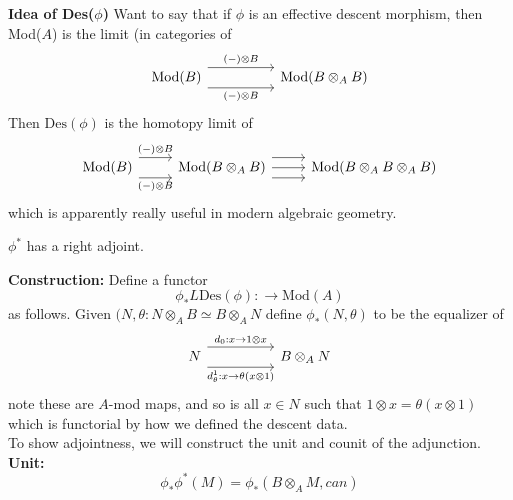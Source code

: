 \documentclass{article}
\theoremstyle{definition}
\theoremstyle{definition}
\theoremstyle{remark}
\begin{document}
\textbf{Idea of Des($\phi$)} Want to say that if $\phi$ is an effective descent morphism, then Mod($A$) is the limit (in categories of 
\[\begin{tikzcd}
	{\text{Mod}(B)} && {\text{Mod}(B\otimes_A B)}
	\arrow["{(-)\otimes B}"', shift right=3, from=1-1, to=1-3]
	\arrow["{(-)\otimes B}", shift left=3, from=1-1, to=1-3]
\end{tikzcd}\]
Then $\text{Des}(\phi)$ is the homotopy limit of
\[\begin{tikzcd}
	{\text{Mod}(B)} & {\text{Mod}(B\otimes_A B)} & {\text{Mod}(B\otimes_A B \otimes _A B)}
	\arrow["{(-)\otimes B}"', shift right=3, from=1-1, to=1-2]
	\arrow["{(-)\otimes B}", shift left=3, from=1-1, to=1-2]
	\arrow[from=1-2, to=1-3]
	\arrow[shift right=3, from=1-2, to=1-3]
	\arrow[shift left=3, from=1-2, to=1-3]
\end{tikzcd}\]
which is apparently really useful in modern algebraic geometry.\\

\begin{lemm}{}{}
	$\phi^*$ has a right adjoint.
\end{lemm}
\textbf{Construction: } Define a functor
\[\phi_*L \text{Des}(\phi): \to \text{Mod}(A)\]
as follows. Given $(N, \theta: N \otimes_A B \simeq B \otimes_A N$  define $\phi_*(N, \theta)$ to be the equalizer of 
\[\begin{tikzcd}
	N && {B \otimes_A N}
	\arrow["{d_0: x \to 1 \otimes x}", shift left=3, from=1-1, to=1-3]
	\arrow["{d^1_{\theta}: x \to \theta(x \otimes 1)}"', shift right=3, from=1-1, to=1-3]
\end{tikzcd}\]
note these are $A$-mod maps, and so is all $x \in N$ such that $1 \otimes x = \theta(x \otimes 1)$
which is functorial by how we defined the descent data.\\

To show adjointness, we will construct the unit and counit of the adjunction.\\

\textbf{Unit:}
\[\phi_* \phi^* (M) = \phi_*(B \otimes_A M, can)\]
\end{document}
